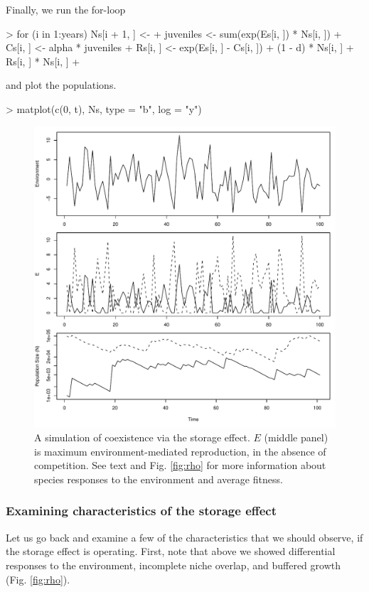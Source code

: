 Finally, we run the for-loop
\begin{Schunk}
\begin{Sinput}
> for (i in 1:years) Ns[i + 1, ] <- {
+     juveniles <- sum(exp(Es[i, ]) * Ns[i, ])
+     Cs[i, ] <- alpha * juveniles
+     Rs[i, ] <- exp(Es[i, ] - Cs[i, ])
+     (1 - d) * Ns[i, ] + Rs[i, ] * Ns[i, ]
+ }
\end{Sinput}
\end{Schunk}
and plot the populations.
\begin{Schunk}
\begin{Sinput}
> matplot(c(0, t), Ns, type = "b", log = "y")
\end{Sinput}
\end{Schunk}
\begin{figure}[ht]
  \centering
  \includegraphics[width=\linewidth]{chessonsim}
  \caption{A simulation of coexistence via the storage effect. $E$ (middle panel) is maximum environment-mediated reproduction, in the absence of competition. See text and Fig. \ref{fig:rho} for more information about species responses to the environment and average fitness.}
  \label{fig:storedyns1}
\end{figure}

\subsubsection{Examining characteristics of the storage effect}
Let us go back and examine a few of the characteristics that we should observe, if the storage effect is operating. First, note that above we showed differential responses to the environment, incomplete niche overlap, and buffered growth (Fig. \ref{fig:rho}). 

